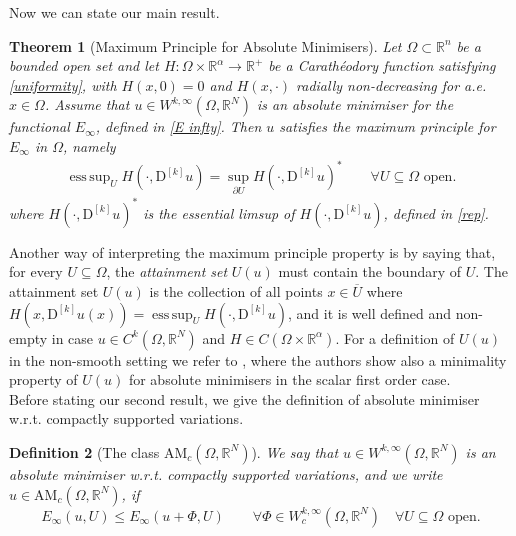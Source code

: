 \documentclass[a4paper,11pt]{article}
\numberwithin{equation}{section}
\newtheorem{Theorem}{Theorem}[section]
\newtheorem{Definition}[Theorem]{Definition}
\newcommand{\numberset}{\mathbb}
\newcommand{\Om}{\Omega}
\newcommand{\R}{\numberset{R}}
\DeclareMathOperator*{\esssup}{ess\,sup}
\theoremstyle{definition}
\begin{document}
Now we can state our main result.
\begin{Theorem}[Maximum Principle for Absolute Minimisers]\label{thm1}
Let $\Om\subset\R^n$ be a bounded open set and let $H:\Om\times\R^\alpha\to\R^+$ be a Carathéodory function satisfying \eqref{uniformity}, with $H(x,0)=0$ and $H(x, \cdot)$ radially non-decreasing for a.e. $x\in\Om$. Assume that $u\in W^{k,\infty}(\Om,\R^N)$ is an absolute minimiser for the functional $E_\infty$, defined in \eqref{E infty}. Then $u$ satisfies the maximum principle for $E_\infty$ in $\Om$, namely
\begin{align}\label{MP}
\esssup_U H(\cdot, \mathrm D ^{[k]}u)=\sup_{\partial U}H(\cdot,\mathrm D ^{[k]}u)^*\qquad\forall U\subseteq\Om \mbox{ open}.
\end{align}
where $H(\cdot,\mathrm D ^{[k]}u)^*$ is the essential limsup of $H(\cdot,\mathrm D ^{[k]}u)$, defined in \eqref{rep}.
\end{Theorem}
Another way of interpreting the maximum principle property is by saying that, for every $U\subseteq\Om$, the \textit{attainment set} $U(u)$ must contain the boundary of $U$. The attainment set $U(u)$ is the collection of all points $x\in \overline U$ where $H(x, \mathrm D ^{[k]}u(x))=\esssup_U H(\cdot, \mathrm D ^{[k]}u)$, and it is well defined and non-empty in case $u\in C^k(\Om,\R^N)$ and $H\in C(\Om\times\R^\alpha)$. For a definition of $U(u)$ in the non-smooth setting we refer to \cite{BDP}, where the authors show also a minimality property of $U(u)$ for absolute minimisers in the scalar first order case.\\

Before stating our second result, we give the definition of absolute minimiser w.r.t. compactly supported variations. 
\begin{Definition}[The class $\mathrm {AM}_c(\Om,\R^N)$]
We say that $u\in W^{k,\infty}(\Om,\R^N)$ is an absolute minimiser w.r.t. compactly supported variations, and we write $u\in \mathrm {AM}_c(\Om,\R^N)$, if
$$
E_\infty(u,U)\leq E_\infty (u+\Phi,U)\qquad\forall \Phi\in W^{k,\infty}_c(\Om,\R^N)\quad\forall U\subseteq\Om\mbox{ open}.
$$
\end{Definition}
\end{document}
